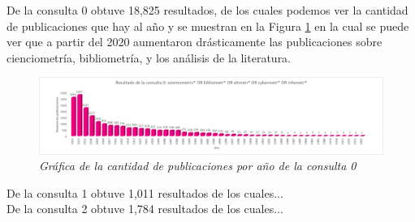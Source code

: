 \documentclass[../Main.tex]{subfiles}
\begin{document}
\noindent
De la consulta 0 obtuve 18,825 resultados, de los cuales podemos ver la cantidad de publicaciones que hay al año y se muestran en la Figura \ref{fig:consulta0} en la cual se puede ver que a partir del 2020 aumentaron drásticamente las publicaciones sobre cienciometría, bibliometría, y los análisis de la literatura. 
\begin{figure}[H]
\centering
\includegraphics[width=1\textwidth]{Imagenes/consulta0.png}
\caption{\textit{Gráfica de la cantidad de publicaciones por año de la consulta 0}}
\label{fig:consulta0}
\end{figure}
De la consulta 1 obtuve 1,011 resultados de los cuales...\\
De la consulta 2 obtuve 1,784 resultados de los cuales...\\
\end{document}
